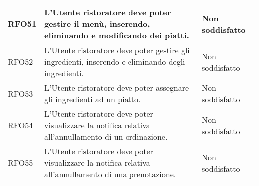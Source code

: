 \begin{longtable}{|l|p{}|p{3cm}|}
	\hline
	RFO51       & L'Utente ristoratore deve poter gestire il menù, inserendo, eliminando e modificando dei piatti.                        & Non soddisfatto \\
	\hline
	RFO52       & L'Utente ristoratore deve poter gestire gli ingredienti, inserendo e eliminando degli ingredienti.                      & Non soddisfatto \\
	\hline
	RFO53       & L'Utente ristoratore deve poter assegnare gli ingredienti ad un piatto.                                                 & Non soddisfatto \\
	\hline
	RFO54       & L'Utente ristoratore deve poter visualizzare la notifica relativa all'annullamento di un ordinazione.                   & Non soddisfatto \\
	\hline
	RFO55       & L'Utente ristoratore deve poter visualizzare la notifica relativa all'annullamento di una prenotazione.                 & Non soddisfatto \\
	\hline
\end{longtable}
